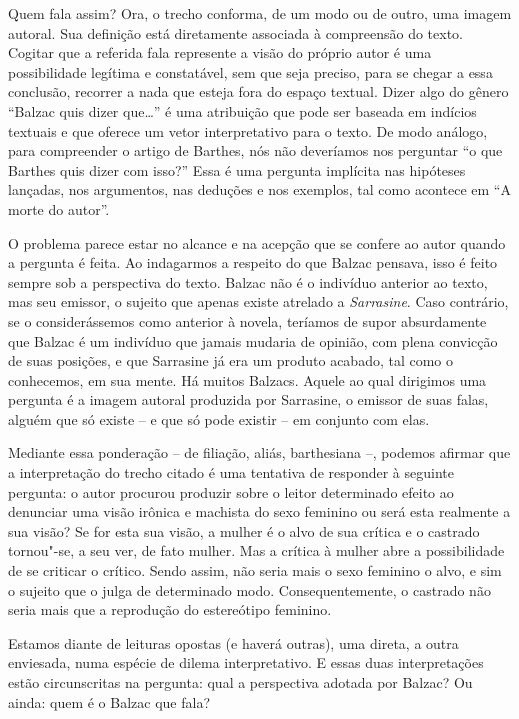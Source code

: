 Quem fala assim? Ora, o trecho conforma, de um modo ou de outro, uma
imagem autoral. Sua definição está diretamente associada à compreensão
do texto. Cogitar que a referida fala represente a visão do próprio
autor é uma possibilidade legítima e constatável, sem que seja preciso,
para se chegar a essa conclusão, recorrer a nada que esteja fora do
espaço textual. Dizer algo do gênero ``Balzac quis dizer que\ldots{}'' é uma
atribuição que pode ser baseada em indícios textuais e que oferece um
vetor interpretativo para o texto. De modo análogo, para compreender o
artigo de Barthes, nós não deveríamos nos perguntar ``o que Barthes quis
dizer com isso?'' Essa é uma pergunta implícita nas hipóteses lançadas,
nos argumentos, nas deduções e nos exemplos, tal como acontece em ``A
morte do autor''.

O problema parece estar no alcance e na acepção que se confere ao autor
quando a pergunta é feita. Ao indagarmos a respeito do que Balzac
pensava, isso é feito sempre sob a perspectiva do texto. Balzac não é o
indivíduo anterior ao texto, mas seu emissor, o sujeito que apenas
existe atrelado a \emph{Sarrasine}. Caso contrário, se o considerássemos como
anterior à novela, teríamos de supor absurdamente que Balzac é um
indivíduo que jamais mudaria de opinião, com plena convicção de suas
posições, e que Sarrasine já era um produto acabado, tal como o
conhecemos, em sua mente. Há muitos Balzacs. Aquele ao qual dirigimos
uma pergunta é a imagem autoral produzida por Sarrasine, o emissor de
suas falas, alguém que só existe -- e que só pode existir -- em conjunto
com elas.

Mediante essa ponderação -- de filiação, aliás, barthesiana --, podemos
afirmar que a interpretação do trecho citado é uma tentativa de
responder à seguinte pergunta: o autor procurou produzir sobre o leitor
determinado efeito ao denunciar uma visão irônica e machista do sexo
feminino ou será esta realmente a sua visão? Se for esta sua visão, a
mulher é o alvo de sua crítica e o castrado tornou"-se, a seu ver, de
fato mulher. Mas a crítica à mulher abre a possibilidade de se criticar
o crítico. Sendo assim, não seria mais o sexo feminino o alvo, e sim o
sujeito que o julga de determinado modo. Consequentemente, o castrado
não seria mais que a reprodução do estereótipo feminino.

Estamos diante de leituras opostas (e haverá outras), uma direta, a
outra enviesada, numa espécie de dilema interpretativo. E essas duas
interpretações estão circunscritas na pergunta: qual a perspectiva
adotada por Balzac? Ou ainda: quem é o Balzac que fala?

